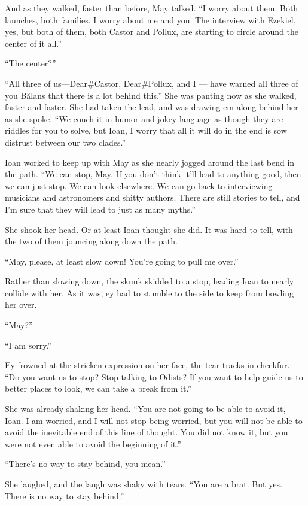 And as they walked, faster than before, May talked. ``I worry about them. Both launches, both families. I worry about me and you. The interview with Ezekiel, yes, but both of them, both Castor and Pollux, are starting to circle around the center of it all.''

``The center?''

``All three of us---Dear\#Castor, Dear\#Pollux, and I — have warned all three of you Bălans that there is a lot behind this.'' She was panting now as she walked, faster and faster. She had taken the lead, and was drawing em along behind her as she spoke. ``We couch it in humor and jokey language as though they are riddles for you to solve, but Ioan, I worry that all it will do in the end is sow distrust between our two clades.''

Ioan worked to keep up with May as she nearly jogged around the last bend in the path. ``We can stop, May. If you don't think it'll lead to anything good, then we can just stop. We can look elsewhere. We can go back to interviewing musicians and astronomers and shitty authors. There are still stories to tell, and I'm sure that they will lead to just as many myths.''

She shook her head. Or at least Ioan thought she did. It was hard to tell, with the two of them jouncing along down the path.

``May, please, at least slow down! You're going to pull me over.''

Rather than slowing down, the skunk skidded to a stop, leading Ioan to nearly collide with her. As it was, ey had to stumble to the side to keep from bowling her over.

``May?''

``I am sorry.''

Ey frowned at the stricken expression on her face, the tear-tracks in cheekfur. ``Do you want us to stop? Stop talking to Odists? If you want to help guide us to better places to look, we can take a break from it.''

She was already shaking her head. ``You are not going to be able to avoid it, Ioan. I am worried, and I will not stop being worried, but you will not be able to avoid the inevitable end of this line of thought. You did not know it, but you were not even able to avoid the beginning of it.''

``There's no way to stay behind, you mean.''

She laughed, and the laugh was shaky with tears. ``You are a brat. But yes. There is no way to stay behind.''

